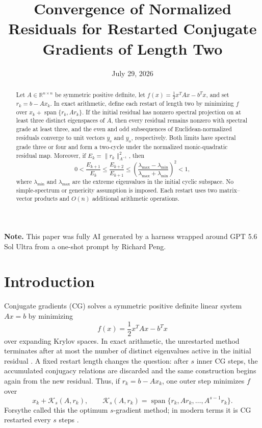 \documentclass[11pt]{article}
\title{Convergence of Normalized Residuals for Restarted Conjugate Gradients of Length Two}
\author{}
\date{July 29, 2026}
\begin{document}

\maketitle

\begin{abstract}
Let \(A\in\mathbb R^{n\times n}\) be symmetric positive definite, let
\(f(x)=\frac12x^TAx-b^Tx\), and set \(r_k=b-Ax_k\).  In exact arithmetic,
define each restart of length two by minimizing \(f\) over
\(x_k+\operatorname{span}\{r_k,Ar_k\}\).  If the initial residual has
nonzero spectral projection on at least three distinct eigenspaces of
\(A\), then every residual remains nonzero with spectral grade at least
three, and the even and odd subsequences of Euclidean-normalized residuals
converge to unit vectors \(y_{\mathrm e}\) and \(y_{\mathrm o}\),
respectively.  Both limits have spectral grade three or four and form a
two-cycle under the normalized monic-quadratic residual map.  Moreover, if
\(E_k=\lVert r_k\rVert_{A^{-1}}^2\), then
\[
  0<\frac{E_{k+1}}{E_k}\leq\frac{E_{k+2}}{E_{k+1}}
  \leq
  \left(\frac{\lambda_{\max}-\lambda_{\min}}
  {\lambda_{\max}+\lambda_{\min}}\right)^2<1,
\]
where \(\lambda_{\min}\) and \(\lambda_{\max}\) are the extreme eigenvalues
in the initial cyclic subspace.  No simple-spectrum or genericity
assumption is imposed.  Each restart uses two matrix--vector products and
\(O(n)\) additional arithmetic operations.
\end{abstract}

\noindent\textbf{Note.} This paper was fully AI generated by a harness wrapped around GPT 5.6 Sol Ultra from a one-shot prompt by Richard Peng.

\clearpage
\tableofcontents
\clearpage


\section{Introduction}
\label{sec:introduction}

Conjugate gradients (CG) solves a symmetric positive definite linear system
\(Ax=b\) by minimizing
\[
 f(x)=\frac12x^TAx-b^Tx
\]
over expanding Krylov spaces.  In exact arithmetic, the unrestarted method
terminates after at most the number of distinct eigenvalues active in the
initial residual \cite{HestenesStiefel1952}.  A fixed restart length changes
the question: after \(s\) inner CG steps, the accumulated conjugacy
relations are discarded and the same construction begins again from the
new residual.  Thus, if \(r_k=b-Ax_k\), one outer step minimizes \(f\) over
\[
 x_k+\mathcal K_s(A,r_k),\qquad
 \mathcal K_s(A,r_k)
 =\operatorname{span}\{r_k,Ar_k,\ldots,A^{s-1}r_k\}.
\]
Forsythe called this the optimum \(s\)-gradient method; in modern terms it
is CG restarted every \(s\) steps
\cite{Forsythe1968,FaberLiesenTichy2023}.
\end{document}
